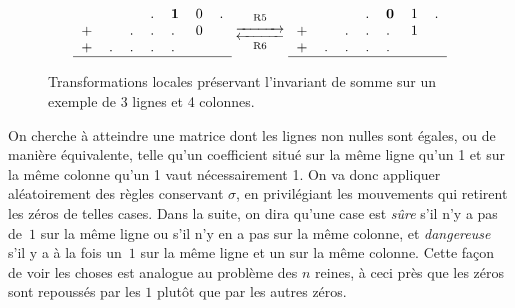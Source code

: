 \begin{figure}[hbt]
{\begin{minipage}{0.6\textwidth}
\[
\begin{tabular}{lllllll}
&&&.&\textbf 1&0&. \\
+&&.&.&.&0&\\
+&.&.&.&.&&\\
\hline
\end{tabular}
\mathrel{\mathop{\longrightleftarrows}^{\mathrm{R5}}_{\mathrm{R6}}}
\begin{tabular}{lllllll}
&&&.&\textbf 0&1&. \\
+&&.&.&.&1&\\
+&.&.&.&.&&\\
\hline
\end{tabular}
\]
\end{minipage}}

\caption{Transformations locales préservant l'invariant de somme sur un exemple
  de 3 lignes et 4 colonnes.}

\label{fig:rules}

\end{figure}



On cherche à atteindre une matrice dont les lignes non nulles sont égales, ou de manière équivalente, telle qu'un coefficient situé sur la même ligne qu'un  1 et sur la même colonne qu'un 1 vaut
nécessairement 1. On va donc
appliquer  aléatoirement des  règles  conservant $\sigma$,  en privilégiant  les
mouvements qui retirent les zéros de telles cases. Dans la suite, on dira qu'une
case est \emph{sûre}  s'il n'y a pas de~$1$  sur la même ligne ou s'il  n'y en a
pas sur la même  colonne, et \emph{dangereuse} s'il y a à  la fois un~$1$ sur la
même ligne et un sur la même colonne. Cette façon de voir les choses est analogue au problème des $n$ reines, 
à ceci près que les zéros sont repoussés par les $1$ plutôt que par les autres zéros.



